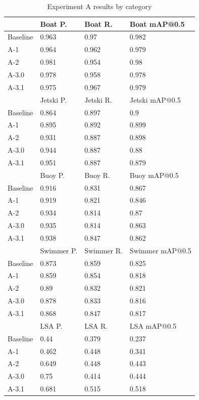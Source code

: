\documentclass[sigplan,nonacm]{acmart}
\begin{document}
\begin{table}[H]
\centering

\begin{tabular}{|l |l |l |l|} \hline     
 & Boat P. & Boat R. & Boat mAP@0.5 \\ \hline 
Baseline  & 0.963 & 0.97 & 0.982 \\ \hline 
A-1& 0.964 & 0.962 & 0.979 \\ \hline 
A-2& 0.981 & 0.954 & 0.98 \\ \hline 
A-3.0& 0.978 & 0.958 & 0.978 \\ \hline 
A-3.1& 0.975 & 0.967 & 0.979 \\ \hline 
 & Jetski P. & Jetski R. & Jetski mAP@0.5 \\ \hline 
Baseline  & 0.864 & 0.897 & 0.9 \\ \hline 
A-1& 0.895 & 0.892 & 0.899 \\ \hline 
A-2& 0.931 & 0.887 & 0.898 \\ \hline 
A-3.0& 0.944 & 0.887 & 0.88 \\ \hline 
A-3.1& 0.951 & 0.887 & 0.879 \\ \hline 
 & Buoy P. & Buoy R. & Buoy mAP@0.5 \\ \hline 
Baseline  & 0.916 & 0.831 & 0.867 \\ \hline 
A-1& 0.919 & 0.821 & 0.846 \\ \hline 
A-2& 0.934 & 0.814 & 0.87 \\ \hline 
A-3.0& 0.935 & 0.814 & 0.863 \\ \hline 
A-3.1& 0.938 & 0.847 & 0.862 \\ \hline 
 & Swimmer P. & Swimmer R. & Swimmer mAP@0.5 \\ \hline 
Baseline  & 0.873 & 0.859 & 0.825 \\ \hline 
A-1& 0.859 & 0.854 & 0.818 \\ \hline 
A-2& 0.89 & 0.832 & 0.821 \\ \hline 
A-3.0& 0.878 & 0.833 & 0.816 \\ \hline 
A-3.1& 0.868 & 0.847 & 0.817 \\ \hline 
 & LSA P. & LSA R. & LSA mAP@0.5 \\ \hline 
Baseline  & 0.44 & 0.379 & 0.237 \\ \hline 
A-1& 0.462 & 0.448 & 0.341 \\ \hline 
A-2& 0.649 & 0.448 & 0.443 \\ \hline 
A-3.0& 0.75 & 0.414 & 0.444 \\ \hline 
A-3.1& 0.681 & 0.515 & 0.518 \\ \hline

\end{tabular}
\caption{Experiment A results by category}

\end{table}
\end{document}

